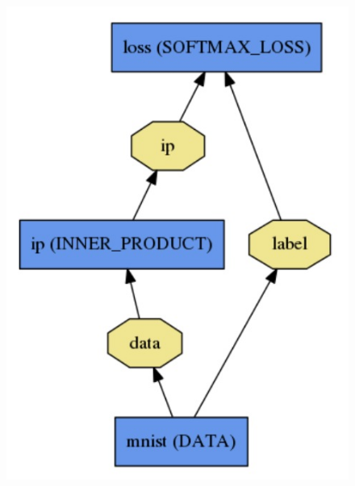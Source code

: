 \begin{itemize}
\begin{figure}[!ht]
  \centering
  \includegraphics[scale=0.7]{figures/logreg.jpg}

\end{figure}
\end{itemize}
